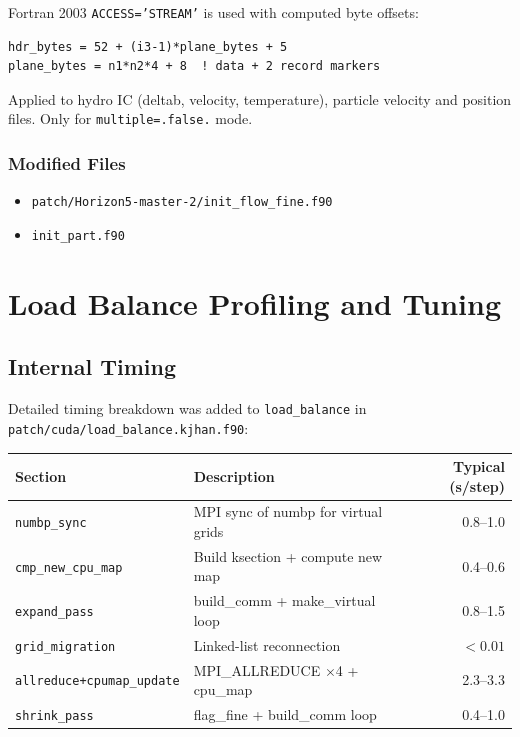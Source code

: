 \documentclass[11pt,fleqn]{book}
\begin{document}
Fortran 2003 \texttt{ACCESS='STREAM'} is used with computed byte offsets:

\begin{lstlisting}[style=fortran,numbers=none]
hdr_bytes = 52 + (i3-1)*plane_bytes + 5
plane_bytes = n1*n2*4 + 8  ! data + 2 record markers
\end{lstlisting}

Applied to hydro IC (deltab, velocity, temperature), particle velocity and position files. Only for \texttt{multiple=.false.} mode.

\subsection{Modified Files}
\begin{itemize}[leftmargin=2em]
  \item \texttt{patch/Horizon5-master-2/init\_flow\_fine.f90}
  \item \texttt{init\_part.f90}
\end{itemize}


\chapter{Load Balance Profiling and Tuning}

\section{Internal Timing}

Detailed timing breakdown was added to \texttt{load\_balance} in \texttt{patch/cuda/load\_balance.kjhan.f90}:

\begin{center}
\begin{tabular}{llr}
\toprule
\textbf{Section} & \textbf{Description} & \textbf{Typical (s/step)} \\
\midrule
\texttt{numbp\_sync} & MPI sync of numbp for virtual grids & 0.8--1.0 \\
\texttt{cmp\_new\_cpu\_map} & Build ksection + compute new map & 0.4--0.6 \\
\texttt{expand\_pass} & build\_comm + make\_virtual loop & 0.8--1.5 \\
\texttt{grid\_migration} & Linked-list reconnection & $< 0.01$ \\
\texttt{allreduce+cpumap\_update} & MPI\_ALLREDUCE $\times$4 + cpu\_map & 2.3--3.3 \\
\texttt{shrink\_pass} & flag\_fine + build\_comm loop & 0.4--1.0 \\
\bottomrule
\end{tabular}
\end{center}
\end{document}
